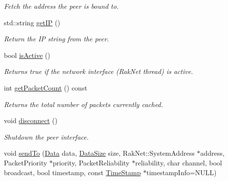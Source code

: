 \begin{DoxyCompactItemize}
\begin{DoxyCompactList}\small\item\em Fetch the address the peer is bound to. \end{DoxyCompactList}\item 
\hypertarget{class_champ_net_1_1_network_a29734a6ba6ab488fc9ed9278ae7239d9}{std\-::string \hyperlink{class_champ_net_1_1_network_a29734a6ba6ab488fc9ed9278ae7239d9}{get\-I\-P} ()}\label{class_champ_net_1_1_network_a29734a6ba6ab488fc9ed9278ae7239d9}

\begin{DoxyCompactList}\small\item\em Return the I\-P string from the peer. \end{DoxyCompactList}\item 
\hypertarget{class_champ_net_1_1_network_a2266d0ef6af69462b1594246cea5b95d}{bool \hyperlink{class_champ_net_1_1_network_a2266d0ef6af69462b1594246cea5b95d}{is\-Active} ()}\label{class_champ_net_1_1_network_a2266d0ef6af69462b1594246cea5b95d}

\begin{DoxyCompactList}\small\item\em Returns true if the network interface (Rak\-Net thread) is active. \end{DoxyCompactList}\item 
\hypertarget{class_champ_net_1_1_network_a29e2e816288fb30919547e221d2414bf}{int \hyperlink{class_champ_net_1_1_network_a29e2e816288fb30919547e221d2414bf}{get\-Packet\-Count} () const }\label{class_champ_net_1_1_network_a29e2e816288fb30919547e221d2414bf}

\begin{DoxyCompactList}\small\item\em Returns the total number of packets currently cached. \end{DoxyCompactList}\item 
\hypertarget{class_champ_net_1_1_network_a6d06699d228d77aff9c358f79c76ed56}{void \hyperlink{class_champ_net_1_1_network_a6d06699d228d77aff9c358f79c76ed56}{disconnect} ()}\label{class_champ_net_1_1_network_a6d06699d228d77aff9c358f79c76ed56}

\begin{DoxyCompactList}\small\item\em Shutdown the peer interface. \end{DoxyCompactList}\item 
\hypertarget{class_champ_net_1_1_network_a1490e576ec8bf76357c56b16658a1aa1}{void \hyperlink{class_champ_net_1_1_network_a1490e576ec8bf76357c56b16658a1aa1}{send\-To} (\hyperlink{class_champ_net_1_1_network_af03ef34820a69b9ef3f2dc3065a29c3f}{Data} data, \hyperlink{class_champ_net_1_1_network_a5f153a3f9a1687d10922c946e2f0662e}{Data\-Size} size, Rak\-Net\-::\-System\-Address $\ast$address, Packet\-Priority $\ast$priority, Packet\-Reliability $\ast$reliability, char channel, bool broadcast, bool timestamp, const \hyperlink{struct_champ_net_1_1_time_stamp}{Time\-Stamp} $\ast$timestamp\-Info=N\-U\-L\-L)}\label{class_champ_net_1_1_network_a1490e576ec8bf76357c56b16658a1aa1}


\end{DoxyCompactItemize}
